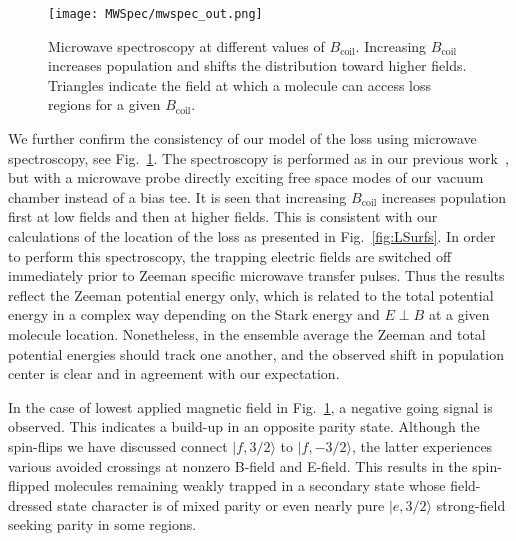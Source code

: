 \documentclass[%
 reprint,
groupedaddress,
 amsmath,amssymb,
 aps,
prl,
]{revtex4-1}
\newcommand{\epb}{{$E\!\perp\!B$}}
\begin{document}
\begin{figure}[tb]
\texttt{[image: MWSpec/mwspec\_out.png]}%
\caption{
Microwave spectroscopy at different values of $B_\text{coil}$. Increasing $B_\text{coil}$ increases population and shifts the distribution toward higher fields. Triangles indicate the field at which a molecule can access loss regions for a given $B_\text{coil}$.
\label{fig:spec}}
\end{figure}

We further confirm the consistency of our model of the loss using microwave spectroscopy, see Fig.~\ref{fig:spec}. The spectroscopy is performed as in our previous work~\cite{Stuhl2012evap}, but with a microwave probe directly exciting free space modes of our vacuum chamber instead of a bias tee. It is seen that increasing $B_{\text{coil}}$ increases population first at low fields and then at higher fields. This is consistent with our calculations of the location of the loss as presented in Fig.~\ref{fig:LSurfs}. In order to perform this spectroscopy, the trapping electric fields are switched off immediately prior to Zeeman specific microwave transfer pulses. Thus the results reflect the Zeeman potential energy only, which is related to the total potential energy in a complex way depending on the Stark energy and \epb{} at a given molecule location. Nonetheless, in the ensemble average the Zeeman and total potential energies should track one another, and the observed shift in population center is clear and in agreement with our expectation. %


In the case of lowest applied magnetic field in Fig.~\ref{fig:spec}, a negative going signal is observed. This indicates a build-up in an opposite parity state. Although the spin-flips we have discussed connect $|f,3/2\rangle$ to $|f,-3/2\rangle$, the latter experiences various avoided crossings at nonzero B-field and E-field. This results in the spin-flipped molecules remaining weakly trapped in a secondary state whose field-dressed state character is of mixed parity or even nearly pure $|e,3/2\rangle$ strong-field seeking parity in some regions. %
\end{document}

